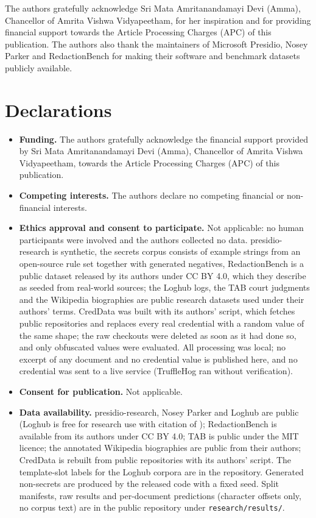 \documentclass[pdflatex,sn-mathphys-num]{sn-jnl}
\theoremstyle{thmstyleone}
\theoremstyle{thmstylethree}
\begin{document}
The authors gratefully acknowledge Sri Mata Amritanandamayi Devi (Amma), Chancellor of Amrita Vishwa Vidyapeetham, for her inspiration and for providing financial support towards the Article Processing Charges (APC) of this publication. The authors also thank the maintainers of Microsoft Presidio, Nosey Parker and RedactionBench for making their software and benchmark datasets publicly available.

\section*{Declarations}

\begin{itemize}
\item \textbf{Funding.} The authors gratefully acknowledge the financial support provided by Sri Mata Amritanandamayi Devi (Amma), Chancellor of Amrita Vishwa Vidyapeetham, towards the Article Processing Charges (APC) of this publication.
\item \textbf{Competing interests.} The authors declare no competing financial or non-financial interests.
\item \textbf{Ethics approval and consent to participate.} Not applicable: no human participants were involved and the authors collected no data. presidio-research is synthetic, the secrets corpus consists of example strings from an open-source rule set together with generated negatives, RedactionBench is a public dataset released by its authors under CC BY 4.0, which they describe as seeded from real-world sources; the Loghub logs, the TAB court judgments and the Wikipedia biographies are public research datasets used under their authors' terms. CredData was built with its authors' script, which fetches public repositories and replaces every real credential with a random value of the same shape; the raw checkouts were deleted as soon as it had done so, and only obfuscated values were evaluated. All processing was local; no excerpt of any document and no credential value is published here, and no credential was sent to a live service (TruffleHog ran without verification).
\item \textbf{Consent for publication.} Not applicable.
\item \textbf{Data availability.} presidio-research, Nosey Parker and Loghub are public (Loghub is free for research use with citation of \cite{zhu2023loghub}); RedactionBench is available from its authors under CC BY 4.0; TAB \cite{pilan2022tab} is public under the MIT licence; the annotated Wikipedia biographies \cite{papadopoulou2022bootstrapping} are public from their authors; CredData \cite{creddata2021} is rebuilt from public repositories with its authors' script. The template-slot labels for the Loghub corpora are in the repository. Generated non-secrets are produced by the released code with a fixed seed. Split manifests, raw results and per-document predictions (character offsets only, no corpus text) are in the public repository under \texttt{research/results/}.

\end{itemize}
\end{document}
